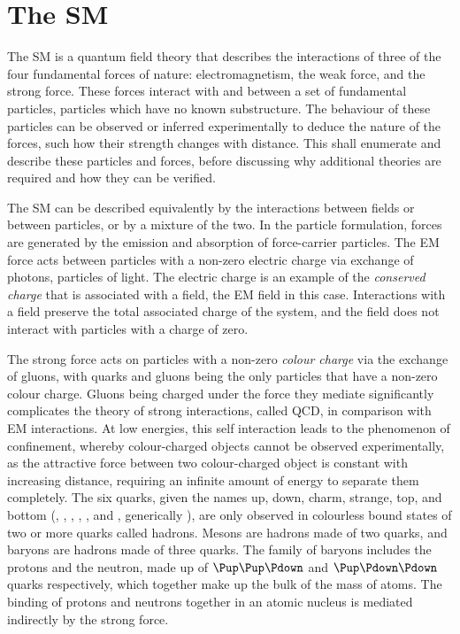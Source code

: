 \chapter{The \acl{SM}}
\label{chap:intro:sm}

The \acf{SM} is a quantum field theory that describes the interactions of three 
of the four fundamental forces of nature: electromagnetism, the weak force, and 
the strong force.
These forces interact with and between a set of fundamental particles, 
particles which have no known substructure.
The behaviour of these particles can be observed or inferred experimentally to 
deduce the nature of the forces, such how their strength changes with distance.
This  shall enumerate and describe these particles and 
forces, before discussing why additional theories are required and how they can 
be verified.

The \ac{SM} can be described equivalently by the interactions between fields or 
between particles, or by a mixture of the two.
In the particle formulation, forces are generated by the emission and 
absorption of force-carrier particles.
The \ac{EM} force acts between particles with a non-zero electric charge via 
exchange of photons, particles of light.
The electric charge is an example of the \emph{conserved charge} that is 
associated with a field, the \ac{EM} field in this case.
Interactions with a field preserve the total associated charge of the system, 
and the field does not interact with particles with a charge of zero.

The strong force acts on particles with a non-zero \emph{colour charge} via the 
exchange of gluons, with quarks and gluons being the only particles that have a 
non-zero colour charge.
Gluons being charged under the force they mediate significantly complicates the 
theory of strong interactions, called \ac{QCD}, in comparison with \ac{EM} 
interactions.
At low energies, this self interaction leads to the phenomenon of confinement, 
whereby colour-charged objects cannot be observed experimentally, as the 
attractive force between two colour-charged object is constant with increasing 
distance, requiring an infinite amount of energy to separate them completely.
The six quarks, given the names up, down, charm, strange, top, and bottom 
(\Pup, \Pdown, \Pcharm, \Pstrange, \Ptop, and \Pbottom, generically \Pquark), 
are only observed in colourless bound states of two or more quarks called 
hadrons.
Mesons are hadrons made of two quarks, and baryons are hadrons made of three 
quarks.
The family of baryons includes the protons and the neutron, made up of 
$\Pup\Pup\Pdown$ and $\Pup\Pdown\Pdown$ quarks respectively, which together 
make up the bulk of the mass of atoms.
The binding of protons and neutrons together in an atomic nucleus is mediated 
indirectly by the strong force.

